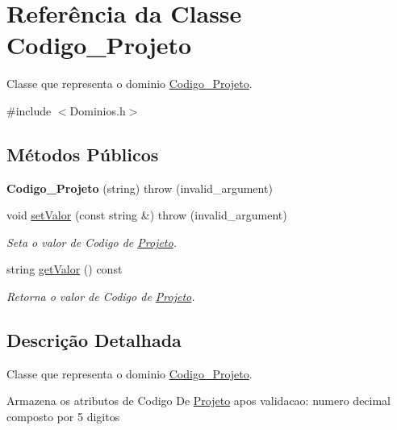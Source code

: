 \hypertarget{class_codigo___projeto}{
\section{\-Referência da \-Classe \-Codigo\-\_\-\-Projeto}
\label{class_codigo___projeto}
}


\-Classe que representa o dominio \hyperlink{class_codigo___projeto}{\-Codigo\-\_\-\-Projeto}.  




{\ttfamily \#include $<$\-Dominios.\-h$>$}

\subsection*{\-Métodos \-Públicos}
\begin{DoxyCompactItemize}
\item 
\hypertarget{class_codigo___projeto_ac3aaa481366d852d0c654bac3f95bc97}{
{\bfseries \-Codigo\-\_\-\-Projeto} (string)  throw (invalid\-\_\-argument)}
\label{class_codigo___projeto_ac3aaa481366d852d0c654bac3f95bc97}

\item 
void \hyperlink{class_codigo___projeto_a8628c9fa45bb9be7c4b25ebfbe2c255c}{set\-Valor} (const string \&)  throw (invalid\-\_\-argument)
\begin{DoxyCompactList}\small\item\em \-Seta o valor de \-Codigo de \hyperlink{class_projeto}{\-Projeto}. \end{DoxyCompactList}\item 
string \hyperlink{class_codigo___projeto_ae2a6a32b20fcdd82dbafeef8cbec5bb2}{get\-Valor} () const 
\begin{DoxyCompactList}\small\item\em \-Retorna o valor de \-Codigo de \hyperlink{class_projeto}{\-Projeto}. \end{DoxyCompactList}\end{DoxyCompactItemize}


\subsection{\-Descrição \-Detalhada}
\-Classe que representa o dominio \hyperlink{class_codigo___projeto}{\-Codigo\-\_\-\-Projeto}. 

\-Armazena os atributos de \-Codigo \-De \hyperlink{class_projeto}{\-Projeto} apos validacao\-: numero decimal composto por 5 digitos 

